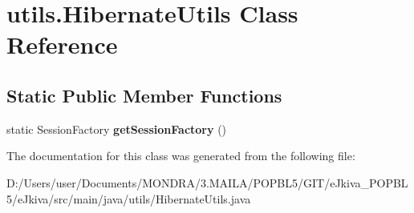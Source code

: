 \hypertarget{classutils_1_1_hibernate_utils}{}\section{utils.\+Hibernate\+Utils Class Reference}
\label{classutils_1_1_hibernate_utils}
\subsection*{Static Public Member Functions}
\begin{DoxyCompactItemize}
\item 
\mbox{\label{classutils_1_1_hibernate_utils_a48f212775a4d87ceb1116c11f05d4053}} 
static Session\+Factory {\bfseries get\+Session\+Factory} ()
\end{DoxyCompactItemize}


The documentation for this class was generated from the following file\+:\begin{DoxyCompactItemize}
\item 
D\+:/\+Users/user/\+Documents/\+M\+O\+N\+D\+R\+A/3.\+M\+A\+I\+L\+A/\+P\+O\+P\+B\+L5/\+G\+I\+T/e\+Jkiva\+\_\+\+P\+O\+P\+B\+L5/e\+Jkiva/src/main/java/utils/Hibernate\+Utils.\+java\end{DoxyCompactItemize}
